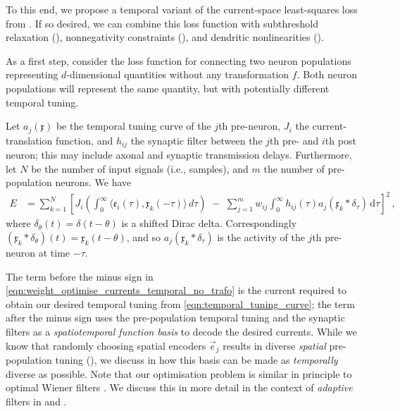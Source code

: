 To this end, we propose a temporal variant of the current-space least-squares loss from .
If so desired, we can combine this loss function with subthreshold relaxation (), nonnegativity constraints (), and dendritic nonlinearities ().

As a first step, consider the loss function for connecting two neuron populations representing $d$-dimensional quantities without any transformation $f$.
Both neuron populations will represent the same quantity, but with potentially different temporal tuning.

Let $a_j(\mathfrak{x})$ be the temporal tuning curve of the $j$th pre-neuron, $J_i$ the current-translation function, and $h_{ij}$ the synaptic filter between the $j$th pre- and $i$th post neuron; this may include axonal and synaptic transmission delays.
Furthermore, let $N$ be the number of input signals (i.e., samples), and $m$ the number of pre-population neurons.
We have
\begin{align}
	E &= \sum_{k = 1}^N \left[
		J_i \left( \! \int_0^\infty \!\!\! \big\langle \mathfrak{e}_i(\tau), \mathfrak{x}_k(-\tau) \big\rangle \, \mathit{d\tau} \right) \,\,-\,\,
		\sum_{j = 1}^m w_{ij} \! \int_0^\infty \!\!\! h_{ij}(\tau) a_j(\mathfrak{x}_k \ast \delta_\tau) \,\mathrm{d}\tau
	\right]^2 \,,
	\label{eqn:weight_optimise_currents_temporal_no_trafo}
\end{align}
where $\delta_{\theta}(t) = \delta(t - \theta)$ is a shifted Dirac delta.
Correspondingly $(\mathfrak{x}_k \ast \delta_{\theta})(t) = \mathfrak{x}_k(t - \theta)$, and so $a_j(\mathfrak{x}_k \ast \delta_\tau)$ is the activity of the $j$th pre-neuron at time $-\tau$.

The term before the minus sign in \cref{eqn:weight_optimise_currents_temporal_no_trafo} is the current required to obtain our desired temporal tuning from \cref{eqn:temporal_tuning_curve}; the term after the minus sign uses the pre-population temporal tuning and the synaptic filters as a \emph{spatiotemporal function basis} to decode the desired currents.
While we know that randomly choosing spatial encoders $\vec e_j$ results in diverse \emph{spatial} pre-population tuning (), we discuss in  how this basis can be made as \emph{temporally} diverse as possible.
Note that our optimisation problem is similar in principle to optimal Wiener filters \citep[Chapter~2]{wiener1949extrapolation,haykin2014adaptive}.
We discuss this in more detail in the context of \emph{adaptive} filters in  and .

